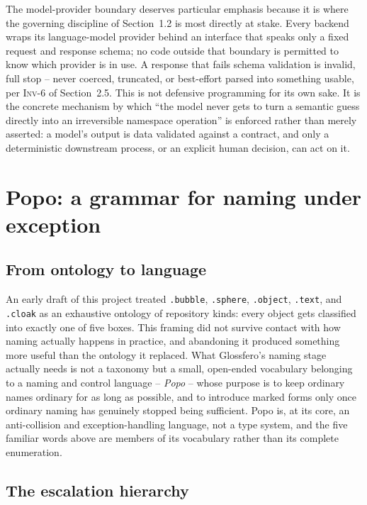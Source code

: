 \documentclass[11pt]{article}
\begin{document}
The model-provider boundary deserves particular emphasis because it is where the governing discipline of Section~1.2 is most directly at stake. Every backend wraps its language-model provider behind an interface that speaks only a fixed request and response schema; no code outside that boundary is permitted to know which provider is in use. A response that fails schema validation is invalid, full stop -- never coerced, truncated, or best-effort parsed into something usable, per \textsc{Inv-6} of Section~2.5. This is not defensive programming for its own sake. It is the concrete mechanism by which ``the model never gets to turn a semantic guess directly into an irreversible namespace operation'' is enforced rather than merely asserted: a model's output is data validated against a contract, and only a deterministic downstream process, or an explicit human decision, can act on it.


\section{Popo: a grammar for naming under exception}

\subsection{From ontology to language}

An early draft of this project treated \texttt{.bubble}, \texttt{.sphere}, \texttt{.object}, \texttt{.text}, and \texttt{.cloak} as an exhaustive ontology of repository kinds: every object gets classified into exactly one of five boxes. This framing did not survive contact with how naming actually happens in practice, and abandoning it produced something more useful than the ontology it replaced. What Glossfero's naming stage actually needs is not a taxonomy but a small, open-ended vocabulary belonging to a naming and control language -- \emph{Popo} -- whose purpose is to keep ordinary names ordinary for as long as possible, and to introduce marked forms only once ordinary naming has genuinely stopped being sufficient. Popo is, at its core, an anti-collision and exception-handling language, not a type system, and the five familiar words above are members of its vocabulary rather than its complete enumeration.

\subsection{The escalation hierarchy}
\end{document}
